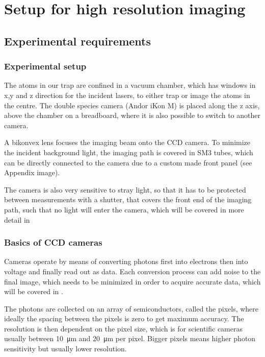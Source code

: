 \chapter{Setup for high resolution imaging}

\section{Experimental requirements}
\subsection{Experimental setup}
	The atoms in our trap are confined in a vacuum chamber, which has windows in x,y and z direction for the incident lasers, to either trap or image the atoms in the centre. The double species camera (Andor iKon M) is placed along the z axis, above the chamber on a breadboard, where it is also possible to switch to another camera.
	
	A bikonvex lens focuses the imaging beam onto the CCD camera. To minimize the incident background light, the imaging path is covered in SM3 tubes, which can be directly connected to the camera due to a custom made front panel (see Appendix image). 
	
	The camera is also very sensitive to stray light, so that it has to be protected between measurements with a shutter, that covers the front end of the imaging path, such that no light will enter the camera, which will be covered in more detail in 
	

\subsection{Basics of CCD cameras}
\label{ch:ccd_basics}
	
	Cameras operate by means of converting photons first into electrons then into voltage and finally read out as data. Each conversion process can add noise to the final image, which needs to be minimized in order to acquire accurate data, which will be covered in .
	
	The photons are collected on an array of semiconductors, called the pixels, where ideally the spacing between the pixels is zero to get maximum accuracy. The resolution is then dependent on the pixel size, which is for scientific cameras usually between \SI{10}{\micro\meter} and \SI{20}{\micro\meter} per pixel. Bigger pixels means higher photon sensitivity but usually lower resolution.
	
